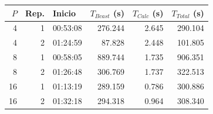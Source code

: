 \begin{center}
\small
\begin{tabular}{rrlrrr}
\toprule
$P$ & Rep. & Inicio & $T_{Bcast}$ (s) & $T_{Calc}$ (s) & $T_{Total}$ (s) \\
\midrule
4 & 1 & 00:53:08 & 276.244 & 2.645 & 290.104 \\
4 & 2 & 01:24:59 & 87.828 & 2.448 & 101.805 \\
8 & 1 & 00:58:05 & 889.744 & 1.735 & 906.351 \\
8 & 2 & 01:26:48 & 306.769 & 1.737 & 322.513 \\
16 & 1 & 01:13:19 & 289.159 & 0.786 & 300.886 \\
16 & 2 & 01:32:18 & 294.318 & 0.964 & 308.340 \\
\bottomrule
\end{tabular}
\end{center}
